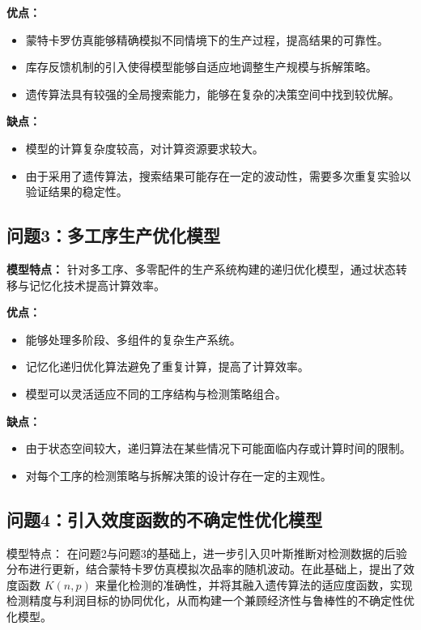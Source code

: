 \documentclass{article}
\begin{document}
	\textbf{优点：}  
	\begin{itemize}
		\item 蒙特卡罗仿真能够精确模拟不同情境下的生产过程，提高结果的可靠性。
		\item 库存反馈机制的引入使得模型能够自适应地调整生产规模与拆解策略。
		\item 遗传算法具有较强的全局搜索能力，能够在复杂的决策空间中找到较优解。
	\end{itemize}
	
	\textbf{缺点：}  
	\begin{itemize}
		\item 模型的计算复杂度较高，对计算资源要求较大。
		\item 由于采用了遗传算法，搜索结果可能存在一定的波动性，需要多次重复实验以验证结果的稳定性。
	\end{itemize}
	
	\subsection*{问题3：多工序生产优化模型}
	
	\textbf{模型特点：}  
	针对多工序、多零配件的生产系统构建的递归优化模型，通过状态转移与记忆化技术提高计算效率。
	
	\textbf{优点：}  
	\begin{itemize}
		\item 能够处理多阶段、多组件的复杂生产系统。
		\item 记忆化递归优化算法避免了重复计算，提高了计算效率。
		\item 模型可以灵活适应不同的工序结构与检测策略组合。
	\end{itemize}
	
	\textbf{缺点：}  
	\begin{itemize}
		\item 由于状态空间较大，递归算法在某些情况下可能面临内存或计算时间的限制。
		\item 对每个工序的检测策略与拆解决策的设计存在一定的主观性。
	\end{itemize}
	
	\subsection*{问题4：引入效度函数的不确定性优化模型}
	
	模型特点：  
	在问题2与问题3的基础上，进一步引入贝叶斯推断对检测数据的后验分布进行更新，结合蒙特卡罗仿真模拟次品率的随机波动。在此基础上，提出了效度函数 $K(n, p)$ 来量化检测的准确性，并将其融入遗传算法的适应度函数，实现检测精度与利润目标的协同优化，从而构建一个兼顾经济性与鲁棒性的不确定性优化模型。
	
\end{document}
